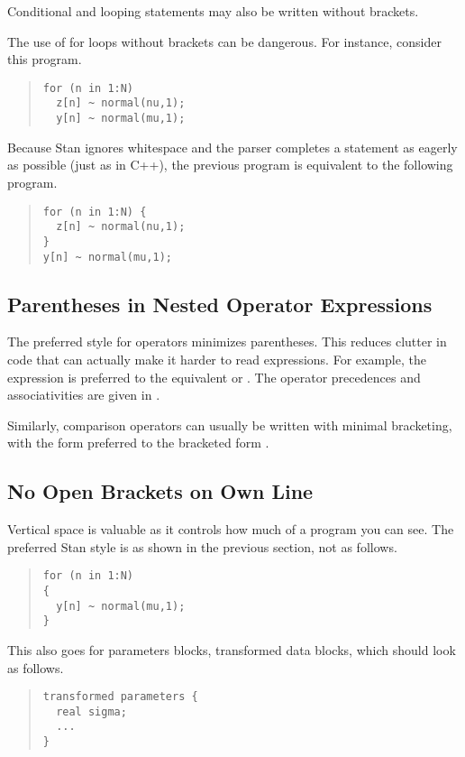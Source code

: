 Conditional and looping statements may also be written without brackets.

The use of for loops without brackets can be dangerous.  For instance,
consider this program.
%
\begin{quote}
\begin{Verbatim}  
for (n in 1:N)
  z[n] ~ normal(nu,1);
  y[n] ~ normal(mu,1);
\end{Verbatim}
\end{quote}
%
Because Stan ignores whitespace and the parser completes a statement
as eagerly as possible (just as in C++), the previous program is
equivalent to the following program.
%
\begin{quote}
\begin{Verbatim}  
for (n in 1:N) {
  z[n] ~ normal(nu,1);
}
y[n] ~ normal(mu,1);
\end{Verbatim}
\end{quote}
%


\subsection{Parentheses in Nested Operator Expressions}

The preferred style for operators minimizes parentheses.  This reduces
clutter in code that can actually make it harder to read expressions.
For example, the expression  is preferred to the
equivalent  or .  The operator
precedences and associativities are given in
.

Similarly, comparison operators can usually be written with minimal
bracketing, with the form  preferred to
the bracketed form .  

\subsection{No Open Brackets on Own Line}

Vertical space is valuable as it controls how much of a program you
can see.  The preferred Stan style is as shown in the previous
section, not as follows.
%
\begin{quote}
\begin{Verbatim}[fontsize=\small]
for (n in 1:N) 
{
  y[n] ~ normal(mu,1);
}
\end{Verbatim}
\end{quote}
%
This also goes for parameters blocks, transformed data blocks, 
which should look as follows.
%
\begin{quote}
\begin{Verbatim}[fontsize=\small]
transformed parameters {
  real sigma;
  ...
}
\end{Verbatim}
\end{quote}
%


